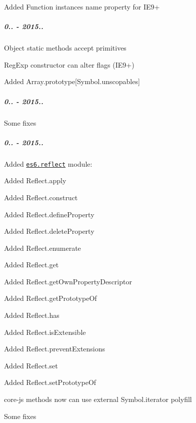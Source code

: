 \begin{DoxyItemize}
\item Added {\ttfamily Function} instances {\ttfamily name} property for I\+E9+
\end{DoxyItemize}

\subparagraph*{0.. -\/ 2015..}


\begin{DoxyItemize}
\item {\ttfamily Object} static methods accept primitives
\item {\ttfamily Reg\+Exp} constructor can alter flags (I\+E9+)
\item Added {\ttfamily Array.\+prototype\mbox{[}Symbol.\+unscopables\mbox{]}}
\end{DoxyItemize}

\subparagraph*{0.. -\/ 2015..}


\begin{DoxyItemize}
\item Some fixes
\end{DoxyItemize}

\subparagraph*{0.. -\/ 2015..}


\begin{DoxyItemize}
\item Added \href{https://github.com/zloirock/core-js/#ecmascript-6-reflect}{\tt {\ttfamily es6.\+reflect}} module\+:
\begin{DoxyItemize}
\item Added {\ttfamily Reflect.\+apply}
\item Added {\ttfamily Reflect.\+construct}
\item Added {\ttfamily Reflect.\+define\+Property}
\item Added {\ttfamily Reflect.\+delete\+Property}
\item Added {\ttfamily Reflect.\+enumerate}
\item Added {\ttfamily Reflect.\+get}
\item Added {\ttfamily Reflect.\+get\+Own\+Property\+Descriptor}
\item Added {\ttfamily Reflect.\+get\+Prototype\+Of}
\item Added {\ttfamily Reflect.\+has}
\item Added {\ttfamily Reflect.\+is\+Extensible}
\item Added {\ttfamily Reflect.\+prevent\+Extensions}
\item Added {\ttfamily Reflect.\+set}
\item Added {\ttfamily Reflect.\+set\+Prototype\+Of}
\end{DoxyItemize}
\item {\ttfamily core-\/js} methods now can use external {\ttfamily Symbol.\+iterator} polyfill
\item Some fixes
\end{DoxyItemize}

